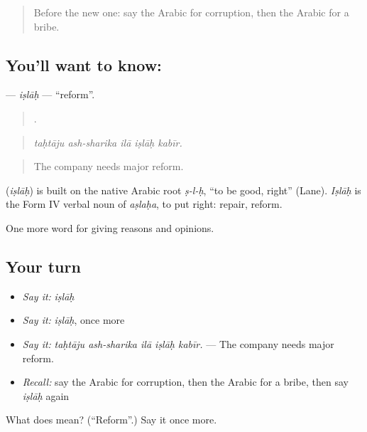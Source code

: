 \begin{quote}
Before the new one: say the Arabic for corruption, then the Arabic for a bribe.
\end{quote}

\subsection*{You'll want to know: }
\textbf{} — \emph{iṣlāḥ} — \textquotedblleft{}reform\textquotedblright{}.

\begin{quote}
    .
\end{quote}

\begin{quote}
\emph{taḥtāju ash-sharika ilā iṣlāḥ kabīr.}
\end{quote}

\begin{quote}
The company needs major reform.
\end{quote}

\begin{cousinweb}
\textbf{} (\emph{iṣlāḥ}) is built on the native Arabic root \emph{ṣ-l-ḥ}, \textquotedblleft{}to be good, right\textquotedblright{} (Lane). \emph{Iṣlāḥ} is the Form IV verbal noun of \emph{aṣlaḥa}, to put right: repair, reform.
\end{cousinweb}

\begin{grammarlens}[title={What you've built}]
One more word for giving reasons and opinions.
\end{grammarlens}

\subsection*{Your turn}
\begin{itemize}
\raggedright
  \item \emph{Say it:} \emph{iṣlāḥ}
  \item \emph{Say it:} \emph{iṣlāḥ}, once more
  \item \emph{Say it:} \emph{taḥtāju ash-sharika ilā iṣlāḥ kabīr.} — The company needs major reform.
  \item \emph{Recall:} say the Arabic for corruption, then the Arabic for a bribe, then say \emph{iṣlāḥ} again
\end{itemize}

\begin{tcolorbox}[breakable,colback=teal!4,colframe=teal!35!black,title={Before you move on}]
What does  mean? (\textquotedblleft{}Reform\textquotedblright{}.) Say it once more.
\end{tcolorbox}
